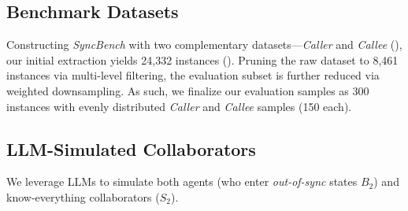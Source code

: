 \subsection{Benchmark Datasets}
\label{Section: Benchmark Datasets}

Constructing \textit{SyncBench} with two complementary datasets---\textit{Caller} and \textit{Callee} (), our initial extraction yields 24,332 instances ().
Pruning the raw dataset to 8,461 instances via multi-level filtering, the evaluation subset is further reduced via weighted downsampling.
As such, we finalize our evaluation samples as 300 instances with evenly distributed \textit{Caller} and \textit{Callee} samples (150 each). 


















\subsection{LLM-Simulated Collaborators}
\label{Section: LLM-simulated Collaborators}
We leverage LLMs to simulate both agents (who enter \textit{out-of-sync} states $B_2$) and know-everything collaborators ($S_2$).

